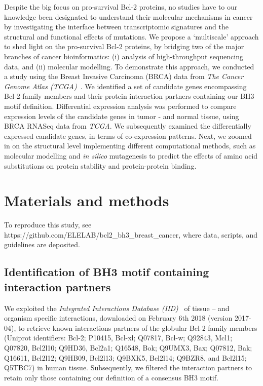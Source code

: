 \documentclass[10pt,letterpaper]{article}
\begin{document}
Despite the big focus on pro-survival Bcl-2 proteins, no studies have to our knowledge been designated to understand their molecular mechanisms in cancer by investigating the interface between transcriptomic signatures and the structural and functional effects of mutations.
We propose a ‘multiscale’ approach to shed light on the pro-survival Bcl-2 proteins, by bridging two of the major branches of cancer bioinformatics: (i) analysis of high-throughput sequencing data, and (ii) molecular modelling. To demonstrate this approach, we conducted a study using the Breast Invasive Carcinoma (BRCA) data from \textit{The Cancer Genome Atlas (TCGA)}~\cite{Chang2013}.
We identified a set of candidate genes encompassing Bcl-2 family members and their protein interaction partners containing our BH3 motif definition. Differential expression analysis was performed to compare expression levels of the candidate genes in tumor - and normal tissue, using BRCA RNASeq data from \textit{TCGA}. We subsequently examined the differentially expressed candidate genes, in terms of co-expression patterns.
Next, we zoomed in on the structural level implementing different computational methods, such as molecular modelling and \textit{in silico} mutagenesis to predict the effects of amino acid substitutions on protein stability and protein-protein binding.


\section*{Materials and methods}

To reproduce this study, see https://github.com/ELELAB/bcl2\_bh3\_breast\_cancer, where data, scripts, and guidelines are deposited. 

\subsection*{Identification of BH3 motif containing interaction partners}

We exploited the \textit{Integrated Interactions Database (IID)}~\cite{Kotlyar2016} of tissue – and organism specific interactions, downloaded on February 6th 2018 (version 2017-04), to retrieve known interactions partners of the globular Bcl-2 family members (Uniprot identifiers: Bcl-2; P10415, Bcl-xl; Q07817, Bcl-w; Q92843, Mcl1; Q07820, Bcl2l10; Q9HD36, Bcl2a1; Q16548, Bok; Q9UMX3, Bax; Q07812, Bak; Q16611, Bcl2l12; Q9HB09, Bcl2l13; Q9BXK5, Bcl2l14; Q9BZR8, and Bcl2l15; Q5TBC7) in human tissue. Subsequently, we filtered the interaction partners to retain only those containing our definition of a consensus BH3 motif. 
\end{document}
